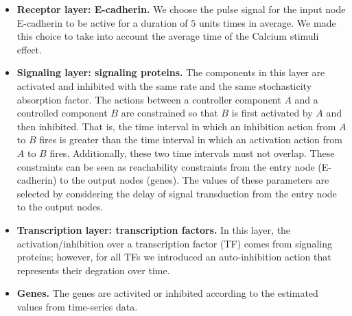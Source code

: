 \begin{itemize}
 \item \textbf{Receptor layer: E-cadherin.} We choose the  pulse signal for the input node E-cadherin to be active for a duration of $5$ units times in average. We made this 
 choice to take into account the average time of the Calcium stimuli effect.
 \item \textbf{Signaling layer: signaling proteins.} The components in this layer are activated and inhibited with the same rate and the same stochasticity absorption factor. 
The actions between a controller component $A$ and a controlled component $B$ are constrained so that 
$B$ is first activated by $A$ and then inhibited.  That is, 
the time interval in which an inhibition action from $A$ to $B$ fires is greater than 
the time interval in which an activation action from $A$ to $B$ fires.
Additionally, these two time intervals must not overlap.
These constraints can be seen as 
reachability constraints from the entry  node (E-cadherin) to the output nodes (genes). The values of these parameters are selected by considering the delay of signal transduction from the entry
 node to the output nodes.
 \item \textbf{Transcription layer: transcription factors.} In this layer, the activation/inhibition over a transcription factor (TF) comes from signaling proteins; however, 
for all TFs we introduced an auto-inhibition action that represents their degration over time. 
 \item \textbf{Genes.} The genes are activited or inhibited according to the estimated values from time-series data.
\end{itemize}


